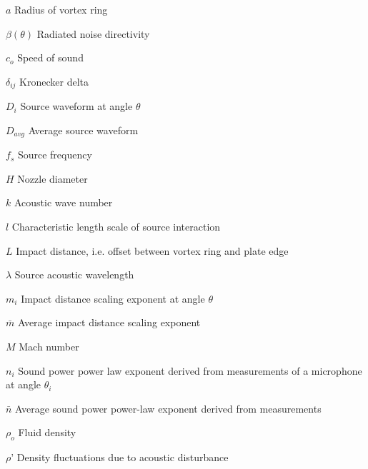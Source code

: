 \begin{eqlist}

\item[$a$] Radius of vortex ring

\item[$\beta(\theta)$] Radiated noise directivity

\item[$c_o$] Speed of sound

\item[$\delta_{ij}$] Kronecker delta

\item[$D_{i}$] Source waveform at angle $\theta$ 

\item[$D_{avg}$] Average source waveform 

\item[$f_s$] Source frequency

\item[$H$] Nozzle diameter

\item[$k$] Acoustic wave number

\item[$l$] Characteristic length scale of source interaction

\item[$L$] Impact distance, i.e. offset between vortex ring and plate edge

\item[$\lambda$] Source acoustic wavelength

\item[${m_i}$] Impact distance scaling exponent at angle $\theta$

\item[$\bar{m}$] Average impact distance scaling exponent

\item[$M$] Mach number

\item[$n_i$] Sound power power law exponent  derived from measurements of a microphone at angle $\theta{_i}$

\item[$\bar{n}$] Average sound power power-law exponent derived from measurements

\item[$\rho_o$] Fluid density

\item[$\rho$'] Density fluctuations due to acoustic disturbance


\end{eqlist}
